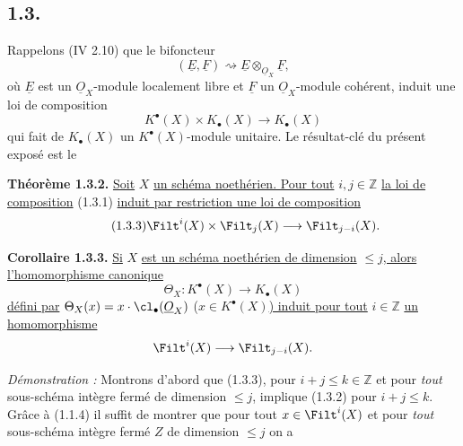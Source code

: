 
\subsection*{1.3.}
Rappelons (IV 2.10) que le bifoncteur
\[
(\underline{E},\underline{F})\rightsquigarrow \underline{E}\otimes_{\underline{O}_X}\underline{F},
\]
où $\underline{E}$ est un $\underline{O}_X$-module localement libre et $\underline{F}$ un $\underline{O}_X$-module cohérent, induit une loi de composition
\begin{equation}\tag{1.3.1}
K^{\bullet}(X)\times K_\bullet(X)\longrightarrow K_\bullet(X)
\end{equation}
qui fait de $K_\bullet(X)$ un $K^{\bullet}(X)$-module unitaire. Le résultat-clé du présent exposé est le

\textbf{Théorème 1.3.2.} \uline{Soit} $X$ \uline{un schéma noethérien. Pour tout} $i,j\in\mathbb Z$ \uline{la loi de composition} (1.3.1) \uline{induit par restriction une loi de composition}
\begin{equation}\tag{1.3.3}
\Filt^i(X)\times\Filt_j(X)\longrightarrow\Filt_{j-i}(X).
\end{equation}

\textbf{Corollaire 1.3.3.} \uline{Si} $X$ \uline{est un schéma noethérien de dimension} $\leq j$\uline{, alors l'homomorphisme canonique}
\[
\Theta_X:K^{\bullet}(X)\longrightarrow K_\bullet(X)
\]
\uline{défini par} $\Theta_X(x)=x\cdot\cl_\bullet(\underline{O}_X)$ ($x\in K^{\bullet}(X)$\uline{) induit pour tout} $i\in\mathbb Z$ \uline{un homomorphisme}
\[
\Filt^i(X)\longrightarrow\Filt_{j-i}(X).
\]

\emph{Démonstration :} Montrons d'abord que (1.3.3), pour $i+j\leq k\in\mathbb Z$ et pour \emph{tout} sous-schéma intègre fermé de dimension $\leq j$, implique (1.3.2) pour $i+j\leq k$. Grâce à (1.1.4) il suffit de montrer que pour tout $x\in\Filt^i(X)$ et pour \emph{tout} sous-schéma intègre fermé $Z$ de dimension $\leq j$ on a
